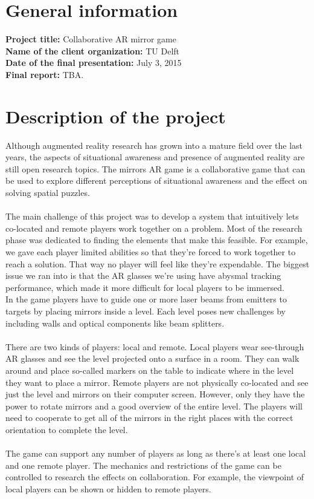 \documentclass[]{article}
\begin{document}
\section*{General information}
\textbf{Project title:} Collaborative AR mirror game\\
\textbf{Name of the client organization:} TU Delft\\
\textbf{Date of the final presentation:} July 3, 2015\\
\textbf{Final report:} TBA.\\

\section*{Description of the project}
Although augmented reality research has grown into a mature field over the last
years, the aspects of situational awareness and presence of augmented reality
are still open research topics. The mirrors AR game is a collaborative game that
can be used to explore different perceptions of situational awareness and the
effect on solving spatial puzzles. \\
\\
The main challenge of this project was to develop a system that intuitively lets
co-located and remote players work together on a problem. Most of the research
phase was dedicated to finding the elements that make this feasible. For
example, we gave each player limited abilities so that they're forced to work
together to reach a solution. That way no player will feel like they're
expendable. The biggest issue we ran into is that the AR glasses we're using
have abysmal tracking performance, which made it more difficult for local
players to be immersed.
\\
In the game players have to guide one or more laser beams from emitters to
targets by placing mirrors inside a level. Each level poses new challenges by
including walls and optical components like beam splitters. \\
\\
There are two kinds of players: local and remote. Local players wear see-through
AR glasses and see the level projected onto a surface in a room. They can walk
around and place so-called markers on the table to indicate where in the level
they want to place a mirror. Remote players are not physically co-located and
see just the level and mirrors on their computer screen. However, only they have
the power to rotate mirrors and a good overview of the entire level. The players
will need to cooperate to get all of the mirrors in the right places with the
correct orientation to complete the level. \\
\\
The game can support any number of players as long as there's at least one local
and one remote player. The mechanics and restrictions of the game can be
controlled to research the effects on collaboration. For example, the viewpoint
of local players can be shown or hidden to remote players.
\end{document}

